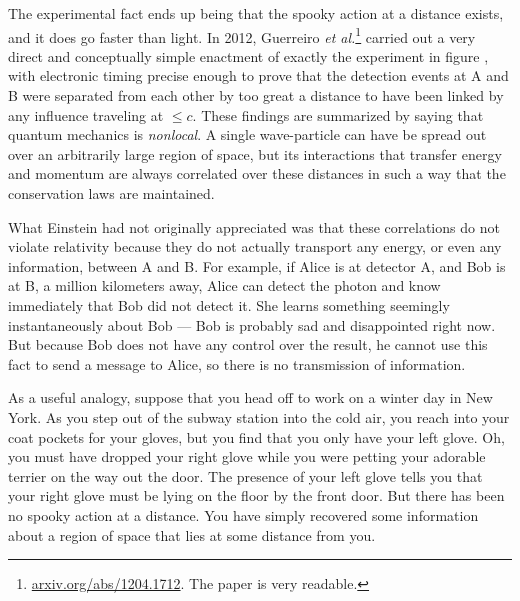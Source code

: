 The experimental fact ends up being that the spooky action at a
distance exists, and it does go faster than light. In 2012, Guerreiro
\emph{et al.}\footnote{\url{arxiv.org/abs/1204.1712}. The paper is
very readable.} carried out a very direct and conceptually simple
enactment of exactly the experiment in figure ,
with electronic timing precise enough to prove that the detection
events at A and B were separated from each other by too great a
distance to have been linked by any influence traveling at $\le c$.
These findings are summarized by saying that quantum mechanics is
\emph{nonlocal}.  A single wave-particle can have be spread out over
an arbitrarily large region of space, but its interactions that
transfer energy and momentum are always correlated over these
distances in such a way that the conservation laws are maintained. 

What Einstein had not originally appreciated was that these
correlations do not violate relativity because they do not actually
transport any energy, or even any information, between A and B. For
example, if Alice is at detector A, and Bob is at B, a million
kilometers away, Alice can detect the photon and know immediately that
Bob did not detect it. She learns something seemingly instantaneously
about Bob --- Bob is probably sad and disappointed right now. But
because Bob does not have any control over the result, he cannot use
this fact to send a message to Alice, so there is no transmission of
information.

As a useful analogy, suppose that you head off to work on a winter day
in New York. As you step out of the subway station into the cold air,
you reach into your coat pockets for your gloves, but you find that
you only have your left glove. Oh, you must have dropped your right
glove while you were petting your adorable terrier on the way out the
door. The presence of your left glove tells you that your right glove
must be lying on the floor by the front door. But there has been no
spooky action at a distance. You have simply recovered some
information about a region of space that lies at some distance from
you.


